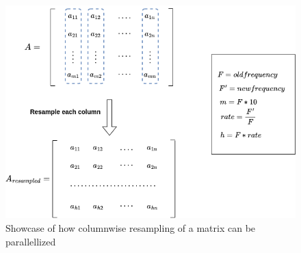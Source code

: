 \begin{figure}[h]
    \centering
    \includegraphics[width=0.8\linewidth]{figures/parallel_resample.png}
    \caption{Showcase of how columnwise resampling of a matrix can be parallellized}
    \label{fig:parres}
\end{figure}
